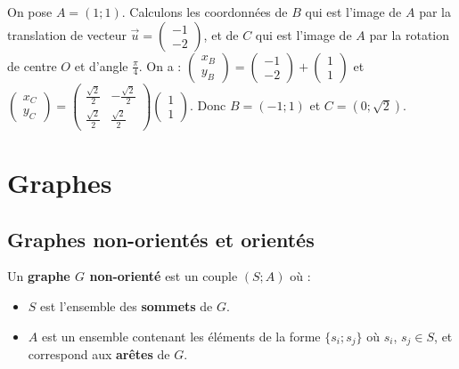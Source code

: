 	\begin{tip}[Exemple]
		On pose $A = (1; 1)$. Calculons les coordonnées de $B$ qui est l'image de $A$ par la translation de vecteur $\displaystyle{\overrightarrow{u} = \begin{pmatrix} -1 \\ -2 \end{pmatrix}}$, et de $C$ qui est l'image de $A$ par la rotation de centre $O$ et d'angle $\displaystyle{\frac{\pi}{4}}$.
		\newpar
		On a :
		\newpar
		$\displaystyle{\begin{pmatrix} x_B \\ y_B \end{pmatrix} = \begin{pmatrix} -1 \\ -2 \end{pmatrix} + \begin{pmatrix} 1 \\ 1 \end{pmatrix}}$ et $\displaystyle{\begin{pmatrix} x_C \\ y_C \end{pmatrix} = \begin{pmatrix} \frac{\sqrt{2}}{2} & -\frac{\sqrt{2}}{2} \\ \frac{\sqrt{2}}{2} & \frac{\sqrt{2}}{2} \end{pmatrix} \begin{pmatrix} 1 \\ 1 \end{pmatrix}}$.
		\newpar
		Donc $B = (-1; 1)$ et $C = (0; \sqrt{2})$.
	\end{tip}

	\section{Graphes}

	\subsection{Graphes non-orientés et orientés}

	\begin{formula}
		Un \textbf{graphe $G$ non-orienté} est un couple $(S; A)$ où :
		\begin{itemize}
			\item $S$ est l'ensemble des \textbf{sommets} de $G$.
			\item $A$ est un ensemble contenant les éléments de la forme $\{s_i; s_j\}$ où $s_i$, $s_j \in S$, et correspond aux \textbf{arêtes} de $G$.
		\end{itemize}
	\end{formula}

